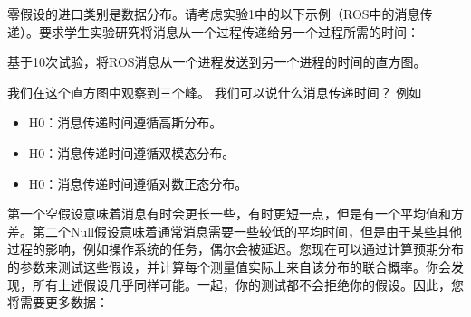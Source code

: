 零假设的进口类别是数据分布。请考虑实验1中的以下示例（ROS中的消息传递）。要求学生实验研究将消息从一个过程传递给另一个过程所需的时间：

\begin{framed}

基于10次试验，将ROS消息从一个进程发送到另一个进程的时间的直方图。
\end{framed}


我们在这个直方图中观察到三个峰。 我们可以说什么消息传递时间？ 例如

\begin{itemize}

\item H0：消息传递时间遵循高斯分布。
\item H0：消息传递时间遵循双模态分布。
\item H0：消息传递时间遵循对数正态分布。
\end{itemize}


第一个空假设意味着消息有时会更长一些，有时更短一点，但是有一个平均值和方差。第二个Null假设意味着通常消息需要一些较低的平均时间，但是由于某些其他过程的影响，例如操作系统的任务，偶尔会被延迟。您现在可以通过计算预期分布的参数来测试这些假设，并计算每个测量值实际上来自该分布的联合概率。你会发现，所有上述假设几乎同样可能。一起，你的测试都不会拒绝你的假设。因此，您将需要更多数据：

